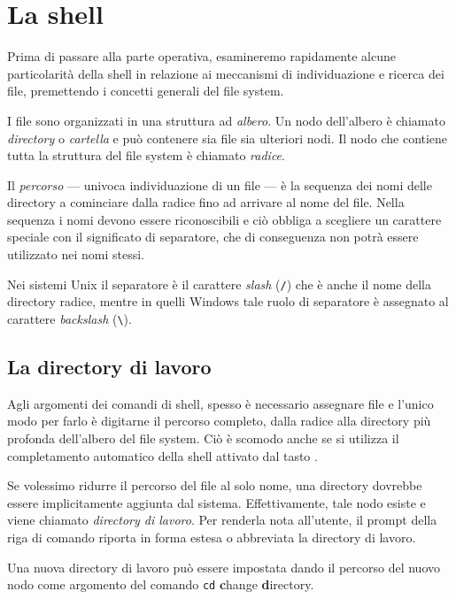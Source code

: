 
\chapter{La shell}
\label{chapShell}

Prima di passare alla parte operativa, esamineremo rapidamente alcune particolarità della shell in relazione ai meccanismi di individuazione e ricerca dei file, premettendo i concetti generali del file system.

I file sono organizzati in una struttura ad \emph{albero}. Un nodo dell'albero è chiamato \emph{directory} o \emph{cartella} e può contenere sia file sia ulteriori nodi. Il nodo che contiene tutta la struttura del file system è chiamato \emph{radice}.

Il \emph{percorso} --- univoca individuazione di un file --- è la sequenza dei nomi delle directory a cominciare dalla radice fino ad arrivare al nome del file. Nella sequenza i nomi devono essere riconoscibili e ciò obbliga a scegliere un carattere speciale con il significato di separatore, che di conseguenza non potrà essere utilizzato nei nomi stessi.

Nei sistemi Unix il separatore è il carattere \emph{slash} (\texttt{/}) che è anche il nome della directory radice, mentre in quelli Windows tale ruolo di separatore è assegnato al carattere \emph{backslash} (\verb=\=).

\section{La directory di lavoro}

Agli argomenti dei comandi di shell, spesso è necessario assegnare file e l'unico modo per farlo è digitarne il percorso completo, dalla radice alla directory più profonda dell'albero del file system. Ciò è scomodo anche se si utilizza il completamento automatico della shell attivato dal tasto .

Se volessimo ridurre il percorso del file al solo nome, una directory dovrebbe essere implicitamente aggiunta dal sistema. Effettivamente, tale nodo esiste e viene chiamato \emph{directory di lavoro}. Per renderla nota all'utente, il prompt della riga di comando riporta in forma estesa o abbreviata la directory di lavoro.

Una nuova directory di lavoro può essere impostata dando il percorso del nuovo nodo come argomento del comando \texttt{cd} \textbf{c}hange \textbf{d}irectory.

